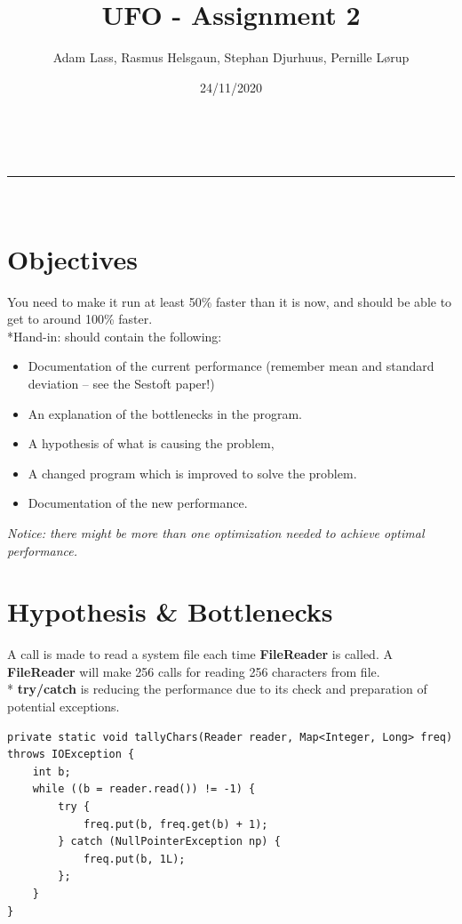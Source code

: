 \documentclass[a4paper,11pt]{article}
\makeatletter
\newcommand{\linia}{\rule{\linewidth}{0.5pt}}
\theoremstyle{mytheor}
\renewcommand{\maketitle}{
\begin{center}
\vspace{2ex}
{\huge \textsc{\@title}}
\vspace{1ex}
\\
\linia\\
\@author \hfill \@date
\vspace{4ex}
\end{center}
}
\makeatother
\begin{document}
\title{UFO - Assignment 2}

\author{Adam Lass, Rasmus Helsgaun, Stephan Djurhuus, Pernille Lørup}

\date{24/11/2020}

\maketitle

\section*{Objectives}

You need to make it run at least 50\% faster than it is now, and should be able to get to around 100\% faster. 
\\*Hand-in: should contain the following:

\begin{itemize}
  \item Documentation of the current performance (remember mean and standard deviation -- see the Sestoft paper!)
  \item An explanation of the bottlenecks in the program.
  \item A hypothesis of what is causing the problem,
  \item A changed program which is improved to solve the problem.
  \item Documentation of the new performance.
\end{itemize}

\emph{Notice: there might be more than one optimization needed to achieve optimal performance.}

\section*{Hypothesis \& Bottlenecks}

A call is made to read a system file each time \textbf{FileReader} is called. A \textbf{FileReader} will make 256 calls for reading 256 characters from file.\\*
\textbf{try/catch} is reducing the performance due to its check and preparation of potential exceptions.

\begin{lstlisting}[label={list:first}]
private static void tallyChars(Reader reader, Map<Integer, Long> freq) throws IOException {
    int b;
    while ((b = reader.read()) != -1) {
        try {
            freq.put(b, freq.get(b) + 1);
        } catch (NullPointerException np) {
            freq.put(b, 1L);
        };
    }
}
\end{lstlisting}
\end{document}
